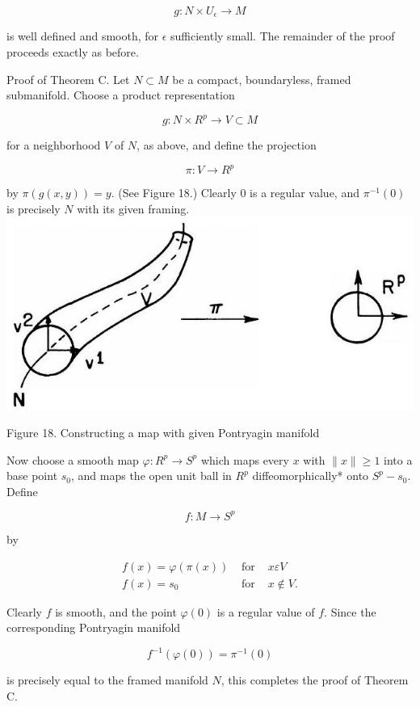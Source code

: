 \documentclass[10pt, letterpaper]{article}
\begin{document}
$$
g: N \times U_{\epsilon} \rightarrow M
$$

is well defined and smooth, for $\epsilon$ sufficiently small. The remainder of the proof proceeds exactly as before.

Proof of Theorem C. Let $N \subset M$ be a compact, boundaryless, framed submanifold. Choose a product representation

$$
g: N \times R^{p} \rightarrow V \subset M
$$

for a neighborhood $V$ of $N$, as above, and define the projection

$$
\pi: V \rightarrow R^{p}
$$

by $\pi(g(x, y))=y$. (See Figure 18.) Clearly 0 is a regular value, and $\pi^{-1}(0)$ is precisely $N$ with its given framing.\\
\includegraphics[scale=0.2, center]{2025_05_28_7c9927389b272ddbc2c3g-58}

Figure 18. Constructing a map with given Pontryagin manifold

Now choose a smooth map $\varphi: R^{p} \rightarrow S^{p}$ which maps every $x$ with $\|x\| \geq 1$ into a base point $s_{0}$, and maps the open unit ball in $R^{p}$ diffeomorphically* onto $S^{p}-s_{0}$. Define

$$
f: M \rightarrow S^{p}
$$

by

$$
\begin{array}{lll}
f(x)=\varphi(\pi(x)) & \text { for } & x \varepsilon V \\
f(x)=s_{0} & \text { for } & x \notin V .
\end{array}
$$

Clearly $f$ is smooth, and the point $\varphi(0)$ is a regular value of $f$. Since the corresponding Pontryagin manifold

$$
f^{-1}(\varphi(0))=\pi^{-1}(0)
$$

is precisely equal to the framed manifold $N$, this completes the proof of Theorem C.
\end{document}
